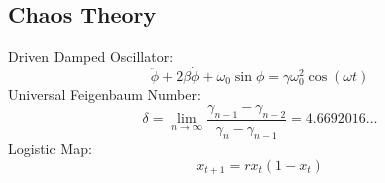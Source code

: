 \documentclass[../PHYS306Notes.tex]{subfiles}
\begin{document}
\subsection{Chaos Theory}
Driven Damped Oscillator:
\begin{equation}
    \ddot{\phi} + 2\beta\dot{\phi} + \omega_0\sin\phi = \gamma\omega_0^2\cos(\omega t)
\end{equation}
Universal Feigenbaum Number:
\begin{equation}
    \delta = \lim_{n \rightarrow \infty}\frac{\gamma_{n-1} - \gamma_{n-2}}{\gamma_n - \gamma_{n-1}} = 4.6692016\ldots
\end{equation}
Logistic Map:
\begin{equation}
    x_{t+1} = rx_{t}(1-x_t)
\end{equation}
\end{document}
